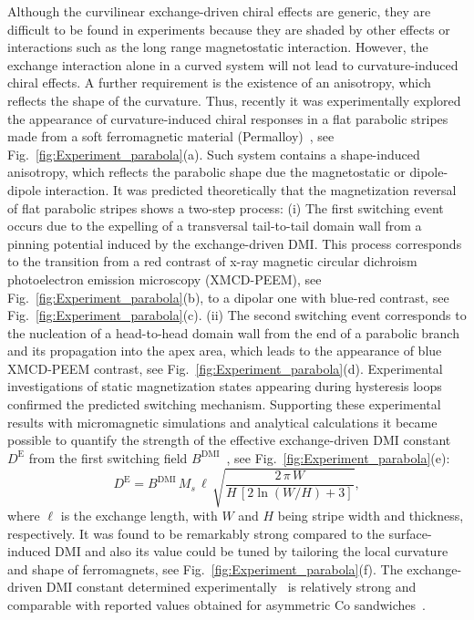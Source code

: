 Although the curvilinear exchange-driven chiral effects are generic, they are difficult to be found in experiments because they are shaded by other effects or interactions such as the long range magnetostatic interaction. However, the exchange interaction alone in a curved system will not lead to curvature-induced chiral effects. A further requirement is the existence of an anisotropy, which reflects the shape of the curvature. Thus, recently it was experimentally explored the appearance of curvature-induced chiral responses in a flat parabolic stripes made from a soft ferromagnetic material (Permalloy)~\cite{Volkov19c}, see Fig.~\ref{fig:Experiment_parabola}(a). Such system contains a shape-induced anisotropy, which reflects the parabolic shape due the magnetostatic or dipole-dipole interaction. It was predicted theoretically that the magnetization reversal of flat parabolic stripes shows a two-step process: (i) The first switching event occurs due to the expelling of a transversal tail-to-tail domain wall from a pinning potential induced by the exchange-driven DMI. This process corresponds to the transition from a red contrast of x-ray magnetic circular dichroism photoelectron emission microscopy (XMCD-PEEM), see Fig.~\ref{fig:Experiment_parabola}(b), to a dipolar one with blue-red contrast, see Fig.~\ref{fig:Experiment_parabola}(c). (ii) The second switching event corresponds to the nucleation of a head-to-head domain wall from the end of a parabolic branch and its propagation into the apex area, which leads to the appearance of blue XMCD-PEEM contrast, see Fig.~\ref{fig:Experiment_parabola}(d). Experimental investigations of static magnetization states appearing during hysteresis loops confirmed the predicted switching mechanism. Supporting these experimental results with micromagnetic simulations and analytical calculations it became possible to quantify the strength of the effective exchange-driven DMI constant $D^\mathrm{E}$ from the first switching field $B^\textrm{DMI}$~\cite{Volkov19c}, see Fig.~\ref{fig:Experiment_parabola}(e): 
\begin{equation} \label{eq:experimental_DMI_coef}
D^\textrm{E} = B^\textrm{DMI} \, M_s \, \ell \, \sqrt{\dfrac{2 \, \pi \, W}{H \, \left[ 2 \ln(W/H)+3 \right]}},
\end{equation}   
where $\ell$ is the exchange length, with $W$ and $H$ being stripe width and thickness, respectively. It was found to be remarkably strong compared to the surface-induced DMI and also its value could be tuned by tailoring the local curvature and shape of ferromagnets, see Fig.~\ref{fig:Experiment_parabola}(f). The exchange-driven DMI constant determined experimentally~\cite{Volkov19c} is relatively strong and comparable with reported values obtained for asymmetric Co sandwiches~\cite{Boulle16}.


